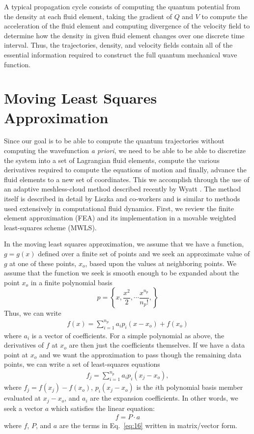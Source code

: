 A typical propagation cycle consists of computing the quantum 
potential from the density at each fluid element, taking the gradient 
of $Q$ and $V$ to compute the acceleration of the fluid element and 
computing divergence of the velocity field to determine how the 
density in given fluid element changes over one discrete time 
interval.  Thus, the trajectories, density, and velocity fields 
contain all of the essential information required to construct the 
full quantum mechanical wave function.


\section{Moving Least Squares Approximation}
Since our goal is to be able to compute the quantum trajectories 
without computing the wavefunction {\it a  priori}, we 
need to be able to be able to discretize the system into a set of 
Lagrangian fluid elements, compute the various derivatives required to 
compute the equations of motion and finally, advance the fluid 
elements to a new set of coordinates.  This we accomplish through the 
use of an adaptive meshless-cloud method described recently by Wyatt 
\cite{ref15,ref16,ref17}.  The method itself is described in 
detail by Liszka and co-workers \cite{ref18} and is 
similar to methods used extensively in computational fluid dynamics.  
First, we review the finite element approximation 
\cite{ref19} (FEA) and its implementation in a movable 
weighted least-squares scheme (MWLS).



In the moving least squares approximation, we assume that we have a 
function, $g= g(x)$ defined over a finite set of points 
and we seek an approximate value of $g$ at one of these 
points, $x_o$, based upon the values at neighboring 
points.  We assume that the function we seek is smooth enough to be 
expanded about the point $x_o$ in a finite 
polynomial basis
\begin{equation}
    p
    =  \left\{x,\frac{{x^2}}{2},\cdots 
\frac{{x^{n_{p}}}}{n_{p}!},\right\}\label{eq:15a}
\label{eq:polynomials}
\end{equation}
Thus, we can write
\begin{eqnarray}
f(x)= \sum_{i=1}^{n_p}a_ip_i(x-x_o)+f(x_o)  \label{eq:15}
\end{eqnarray}
where $a_i$ is a vector of coefficients.  For a simple polynomial as 
above, the derivatives of $f$
at $x_o$ are then just the coefficients 
themselves.  If we have a data point at $x_o$ and we 
want the approximation to pass though the remaining data points, we 
can write a set of least-squares equations
\begin{eqnarray}
f_j=\sum_{i=1}^{{n_p}}{a_i}{p_i}({x_j}-{x_o}),
    \label{eq:16}
\end{eqnarray}
where $f_j= f(x_j)-f(x_o)$, $p_i(x_j-x_o)$ is the $i$th polynomial 
basis member evaluated at ${x_j}-{x_o}$, and $a_i$ are the expansion 
coefficients.  In other words, we seek a vector $a$ which 
satisfies the linear equation:
\begin{eqnarray}
f=P\cdot a
\end{eqnarray}
where $f$, $P$, and $a$ are the terms in Eq.~\ref{eq:16} written in matrix/vector form.

